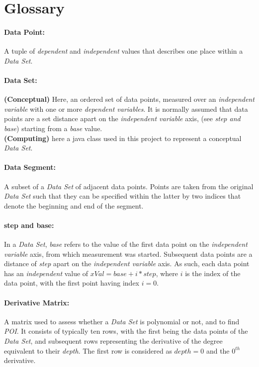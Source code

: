 \documentclass[main.tex]{subfiles}
\begin{document}
  
  \section{Glossary}
  
    \paragraph{Data Point:} A tuple of \textit{dependent} and \textit{independent} values that describes one place within a \textit{Data Set}.
    
    \paragraph{Data Set:} \textbf{(Conceptual)} Here, an ordered set of data points, measured over an \textit{independent variable} with one or more \textit{dependent variables}. It is normally assumed that data points are a set distance apart on the \textit{independent variable} axis, (see \textit{step and base}) starting from a \textit{base} value.  \\
    \textbf{(Computing)} here a java class used in this project to represent a conceptual \textit{Data Set}.
    
    \paragraph{Data Segment:} A subset of a \textit{Data Set} of adjacent data points. Points are taken from the original \textit{Data Set} such that they can be specified within the latter by two indices that denote the beginning and end of the segment.
    
    \paragraph{step and base:} In a \textit{Data Set}, \textit{base} refers to the value of the first data point on the \textit{independent variable} axis, from which measurement was started. Subsequent data points are a distance of \textit{step} apart on the \textit{independent variable} axis. As such, each data point has an \textit{independent} value of $xVal=base+  i * step$, where $i$ is the index of the data point, with the first point having index $i=0$.
    
    \paragraph{Derivative Matrix:} A matrix used to assess whether a \textit{Data Set} is polynomial or not, and to find \textit{POI}. It consists of typically ten rows, with the first being the data points of the \textit{Data Set}, and subsequent rows representing the derivative of the degree equivalent to their \textit{depth}. The first row is considered as $depth=0$ and the $0^{th}$ derivative.
    
\end{document}
